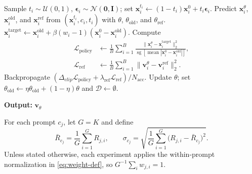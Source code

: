 \documentclass[10pt]{article} %
\begin{document}
\begin{algorithm}[H]
\begin{algorithmic}[1]
                \State Sample $t_i\sim\mathcal{U}(0,1)$,
                $\boldsymbol{\epsilon}_i\sim\mathcal{N}(\mathbf{0},\mathbf{I})$;
                set $\mathbf{x}_i^{t_i}\leftarrow
                (1-t_i)\mathbf{x}_i^0+t_i\boldsymbol{\epsilon}_i$.
                \State Predict $\mathbf{x}_i^\theta$,
                $\mathbf{x}_i^{\mathrm{old}}$, and $\mathbf{x}_i^{\mathrm{ref}}$
                from $(\mathbf{x}_i^{t_i},c_i,t_i)$ with
                $\theta$, $\theta_{\mathrm{old}}$, and $\theta_{\mathrm{ref}}$.
                \State $\mathbf{x}_i^{\mathrm{target}}\leftarrow
                \mathbf{x}_i^{\mathrm{old}}+
                \beta(w_i-1)(\mathbf{x}_i^0-\mathbf{x}_i^{\mathrm{old}})$.
                \State Compute
                \[
                    \begin{aligned}
                    \mathcal{L}_{\mathrm{policy}}
                    &\leftarrow\frac{1}{B}\sum_{i=1}^{B}
                    \frac{\|\mathbf{x}_i^\theta-\mathbf{x}_i^{\mathrm{target}}\|_2^2}
                    {\operatorname{sg}[\operatorname{mean}
                    |\mathbf{x}_i^0-\mathbf{x}_i^{\mathrm{old}}|]},\\
                    \mathcal{L}_{\mathrm{ref}}
                    &\leftarrow\frac{1}{B}\sum_{i=1}^{B}
                    \|\mathbf{v}_i^\theta-\mathbf{v}_i^{\mathrm{ref}}\|_2^2.
                    \end{aligned}
                \]
                \State Backpropagate
                $(\Delta_{clip}\mathcal{L}_{\mathrm{policy}}+
                \lambda_{\mathrm{ref}}\mathcal{L}_{\mathrm{ref}})/N_{\mathrm{acc}}$.
            \EndFor
            \State Update $\theta$; set
            $\theta_{\mathrm{old}}\leftarrow
            \eta\theta_{\mathrm{old}}+(1-\eta)\theta$ and
            $\mathcal{D}\leftarrow\emptyset$.
        \EndFor
    \end{algorithmic}
    \textbf{Output:} $\mathbf{v}_\theta$
\end{algorithm}

For each prompt \(c_j\), let \(G=K\) and define
\[
\bar R_{c_j}=\frac{1}{G}\sum_{i=1}^{G}R_{j,i},
\qquad
\sigma_{c_j}=\sqrt{\frac{1}{G}\sum_{i=1}^{G}
\bigl(R_{j,i}-\bar R_{c_j}\bigr)^2}.
\]
Unless stated otherwise, each experiment applies the within-prompt normalization
in \eqref{eq:weight-def}, so \(G^{-1}\sum_i w_{j,i}=1\).
\end{document}
